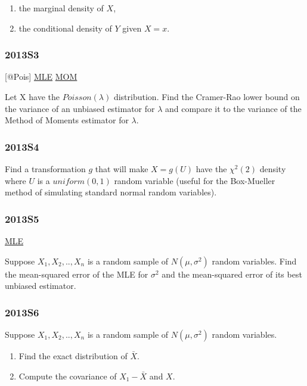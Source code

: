 \documentclass[10pt,twocolumn,portrait]{article}
\begin{document}
\begin{enumerate}
\def\labelenumi{(\alph{enumi})}
\item
  the marginal density of \(X\),
\item
  the conditional density of \(Y\) given \(X=x\).
\end{enumerate}

\hypertarget{s3-3}{%
\subsubsection{2013S3}\label{s3-3}}

{[}@Pois{]} \protect\hyperlink{MLE}{MLE}
\protect\hyperlink{section-2}{MOM}

Let X have the \(Poisson(\lambda)\) distribution. Find the Cramer-Rao
lower bound on the variance of an unbiased estimator for \(\lambda\) and
compare it to the variance of the Method of Moments estimator for
\(\lambda\).

\hypertarget{s4-3}{%
\subsubsection{2013S4}\label{s4-3}}

Find a transformation \(g\) that will make \(X=g(U)\) have the
\(\chi^2(2)\) density where \(U\) is a \(uniform(0,1)\) random variable
(useful for the Box-Mueller method of simulating standard normal random
variables).

\hypertarget{s5-3}{%
\subsubsection{2013S5}\label{s5-3}}

\protect\hyperlink{MLE}{MLE}

Suppose \(X_1,X_2,..,X_{n}\) is a random sample of \(N(\mu,\sigma^2)\)
random variables. Find the mean-squared error of the MLE for
\(\sigma^2\) and the mean-squared error of its best unbiased estimator.

\hypertarget{s6-3}{%
\subsubsection{2013S6}\label{s6-3}}

Suppose \(X_1,X_2,..,X_{n}\) is a random sample of \(N(\mu,\sigma^2)\)
random variables.

\begin{enumerate}
\def\labelenumi{(\alph{enumi})}
\item
  Find the exact distribution of \(\bar X\).
\item
  Compute the covariance of \(X_1-\bar X\) and \(X\).
\end{enumerate}
\end{document}
